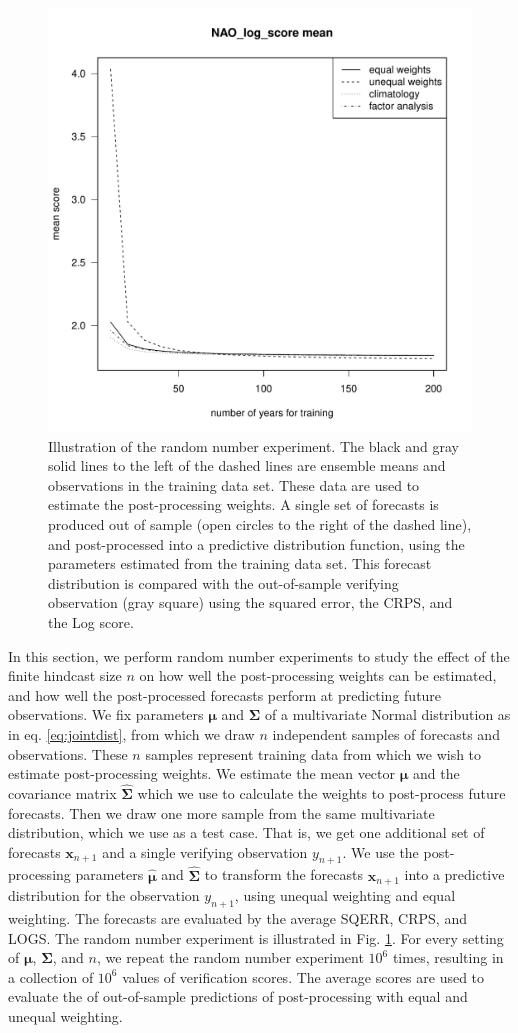 \documentclass[12pt]{article}
\renewcommand{\vec}[1]{\bm{#1}}
\newcommand{\mat}[1]{\bm{#1}}
\begin{document}
\begin{figure}
\centering
\includegraphics[width=.7\textwidth, page=15]{../R/n-dependence.pdf}
\caption{Illustration of the random number experiment. The black and gray solid lines to the left of the dashed lines are ensemble means and observations in the training data set. These data are used to estimate the post-processing weights. A single set of forecasts is produced out of sample (open circles to the right of the dashed line), and post-processed into a predictive distribution function, using the parameters estimated from the training data set. This forecast distribution is compared with the out-of-sample verifying observation (gray square) using the squared error, the CRPS, and the Log score.}
\label{fig:illu}
\end{figure}


In this section, we perform random number experiments to study the effect of the finite hindcast size $n$ on how well the post-processing weights can be estimated, and how well the post-processed forecasts perform at predicting future observations.
We fix parameters $\vec{\mu}$ and $\mat{\Sigma}$ of a multivariate Normal distribution as in eq. \ref{eq:jointdist}, from which we draw $n$ independent samples of forecasts and observations.
These $n$ samples represent training data from which we wish to estimate post-processing weights.
We estimate the mean vector $\hat{\vec{\mu}}$ and the covariance matrix $\hat{\mat{\Sigma}}$ which we use to calculate the weights to post-process future forecasts.
Then we draw one more sample from the same multivariate distribution, which we use as a test case. 
That is, we get one additional set of forecasts $\vec{x}_{n+1}$ and a single verifying observation $y_{n+1}$.
We use the post-processing parameters $\hat{\vec{\mu}}$ and $\hat{\mat{\Sigma}}$ to transform the forecasts $\vec{x}_{n+1}$ into a predictive distribution for the observation $y_{n+1}$, using unequal weighting and equal weighting.
The forecasts are evaluated by the average SQERR, CRPS, and LOGS.
The random number experiment is illustrated in Fig. \ref{fig:illu}.
For every setting of $\vec{\mu}$, $\mat{\Sigma}$, and $n$, we repeat the random number experiment $10^6$ times, resulting in a collection of $10^6$ values of verification scores. 
The average scores are used to evaluate the of out-of-sample predictions of post-processing with equal and unequal weighting.
\end{document}
